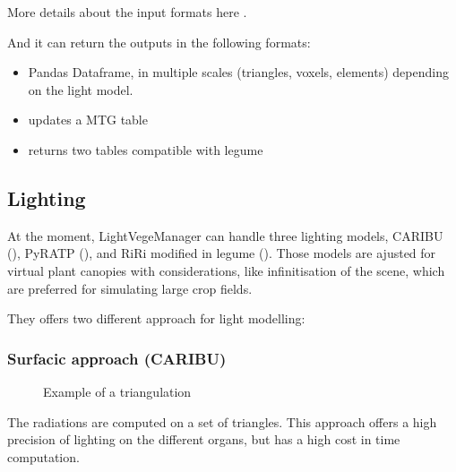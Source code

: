 \documentclass[letterpaper,10pt,english]{sphinxmanual}
\let\sphinxpxdimen\pdfpxdimen\else\newdimen\sphinxpxdimen
\begin{document}
\sphinxAtStartPar
More details about the input formats here {\hyperref[\detokenize{inputs:scenes}]{}}.

\sphinxAtStartPar
And it can return the outputs in the following formats:
\begin{itemize}
\item {} 
\sphinxAtStartPar
Pandas Dataframe, in multiple scales (triangles, voxels, elements) depending on the light model.

\item {} 
\sphinxAtStartPar
updates a MTG table

\item {} 
\sphinxAtStartPar
returns two tables compatible with l\sphinxhyphen{}egume

\end{itemize}


\subsection{Lighting}
\label{\detokenize{presentation:lighting}}
\sphinxAtStartPar
At the moment, LightVegeManager can handle three lighting models, CARIBU (), PyRATP (), and RiRi modified in l\sphinxhyphen{}egume ().
Those models are ajusted for virtual plant canopies with considerations, like infinitisation of the scene, which are preferred for simulating large crop fields.

\sphinxAtStartPar
They offers two different approach for light modelling:


\subsubsection{Surfacic approach (CARIBU)}
\label{\detokenize{presentation:surfacic-approach-caribu}}
\begin{figure}[htbp]
\centering
\capstart

\noindent\sphinxincludegraphics[width=851\sphinxpxdimen,height=769\sphinxpxdimen]{{triangles}.PNG}
\caption{Example of a triangulation}\label{\detokenize{presentation:id3}}\end{figure}

\sphinxAtStartPar
The radiations are computed on a set of triangles.
This approach offers a high precision of lighting on the different organs, but has a high cost in time computation.
\end{document}
